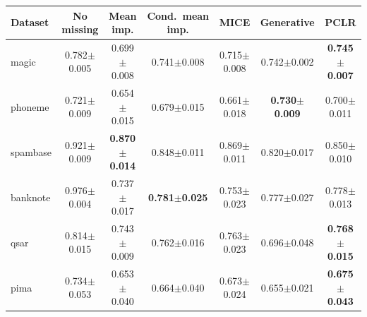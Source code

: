 \begin{tabular}{lcccccc}
\toprule
Dataset & No missing & Mean imp. & Cond.\ mean imp. & MICE & Generative & PCLR \\
\midrule
magic & 0.782{\scriptsize$\pm$0.005} & 0.699{\scriptsize$\pm$0.008} & 0.741{\scriptsize$\pm$0.008} & 0.715{\scriptsize$\pm$0.008} & 0.742{\scriptsize$\pm$0.002} & \textbf{0.745{\scriptsize$\pm$0.007}} \\
phoneme & 0.721{\scriptsize$\pm$0.009} & 0.654{\scriptsize$\pm$0.015} & 0.679{\scriptsize$\pm$0.015} & 0.661{\scriptsize$\pm$0.018} & \textbf{0.730{\scriptsize$\pm$0.009}} & 0.700{\scriptsize$\pm$0.011} \\
spambase & 0.921{\scriptsize$\pm$0.009} & \textbf{0.870{\scriptsize$\pm$0.014}} & 0.848{\scriptsize$\pm$0.011} & 0.869{\scriptsize$\pm$0.011} & 0.820{\scriptsize$\pm$0.017} & 0.850{\scriptsize$\pm$0.010} \\
banknote & 0.976{\scriptsize$\pm$0.004} & 0.737{\scriptsize$\pm$0.017} & \textbf{0.781{\scriptsize$\pm$0.025}} & 0.753{\scriptsize$\pm$0.023} & 0.777{\scriptsize$\pm$0.027} & 0.778{\scriptsize$\pm$0.013} \\
qsar & 0.814{\scriptsize$\pm$0.015} & 0.743{\scriptsize$\pm$0.009} & 0.762{\scriptsize$\pm$0.016} & 0.763{\scriptsize$\pm$0.023} & 0.696{\scriptsize$\pm$0.048} & \textbf{0.768{\scriptsize$\pm$0.015}} \\
pima & 0.734{\scriptsize$\pm$0.053} & 0.653{\scriptsize$\pm$0.040} & 0.664{\scriptsize$\pm$0.040} & 0.673{\scriptsize$\pm$0.024} & 0.655{\scriptsize$\pm$0.021} & \textbf{0.675{\scriptsize$\pm$0.043}} \\
\bottomrule
\end{tabular}

